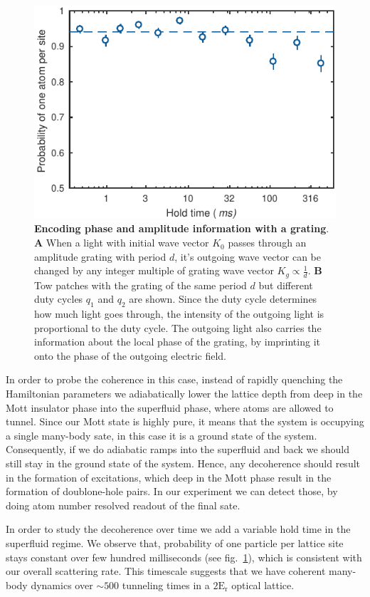 \begin{figure}[t]
	\centering
	\includegraphics[scale=1]{figures/CBH_melt_and_back_p1.pdf}
	\caption{{\bf Encoding phase and amplitude information with a grating}. {\bf A} When a light with initial wave vector $K_0$ passes through an amplitude grating with period $d$, it's outgoing wave vector can be changed by any integer multiple of grating wave vector $K_g\propto \frac{1}{d}$. {\bf B} Tow patches with the grating of the same period $d$ but different duty cycles $q_1$ and $q_2$ are shown. Since the duty cycle determines how much light goes through, the intensity of the outgoing light is proportional to the duty cycle. The outgoing light also carries the information about the local phase of the grating, by imprinting it onto the phase of the outgoing electric field.}
	\label{fig:CBH_melt_and_back}
\end{figure}

In order to probe the coherence in this case, instead of rapidly quenching the Hamiltonian parameters we adiabatically lower the lattice depth from deep in the Mott insulator phase into the superfluid phase, where atoms are allowed to tunnel. Since our Mott state is highly pure, it means that the system is occupying a single many-body sate, in this case it is a ground state of the system. Consequently, if we do adiabatic ramps into the superfluid and back we should still stay in the ground state of the system. Hence, any decoherence should result in the formation of excitations, which deep in the Mott phase result in the formation of doublone-hole pairs. In our experiment we can detect those, by doing atom number resolved readout of the final sate.

In order to study the decoherence over time we add a variable hold time in the superfluid regime. We observe that, probability of one particle per lattice site stays constant over few hundred milliseconds (see fig.~\ref{fig:CBH_melt_and_back}), which is consistent with our overall scattering rate. This timescale suggests that we have coherent many-body dynamics over $\sim 500$ tunneling times in a $2\mathrm{E_r}$ optical lattice.